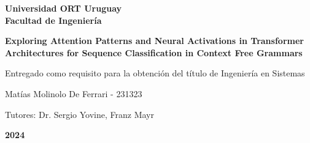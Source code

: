 \begin{center}

\textbf{\fontsize{14pt}{21pt}\selectfont Universidad ORT Uruguay\\Facultad de Ingeniería}

\bigskip\bigskip\bigskip\bigskip


\fontsize{24.88pt}{30pt}\selectfont 
\textbf{Exploring Attention Patterns and Neural Activations in Transformer Architectures for Sequence Classification in Context Free Grammars}


\bigskip\bigskip\bigskip\bigskip


\fontsize{14pt}{21pt}\selectfont Entregado como requisito para la obtención del título de Ingeniería en Sistemas


\bigskip
\bigskip
\bigskip\bigskip\bigskip


\fontsize{14pt}{21pt}\selectfont Matías Molinolo De Ferrari - 231323


\bigskip
\bigskip
\bigskip
\bigskip
\fontsize{14pt}{21pt}\selectfont Tutores: Dr. Sergio Yovine, Franz Mayr


\bigskip\bigskip\bigskip\bigskip


\fontsize{20.74pt}{21pt}\selectfont \textbf{2024}


\end{center}
\vspace*{\fill}
